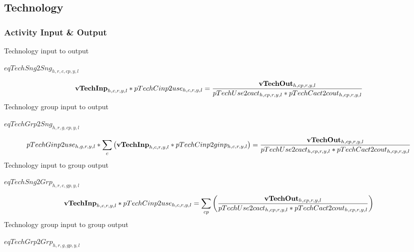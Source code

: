 \documentclass{article}
\begin{document}
\subsection*{Technology}
\subsubsection*{Activity Input \& Output}
Technology input to output







$eqTechSng2Sng_{h,r,c,cp,y,l}$





\begin{dmath} 
{\bf vTechInp}_{h,c,r,y,l}*pTechCinp2use_{h,c,r,y,l}  =  \frac{{\bf vTechOut}_{h,cp,r,y,l}}{pTechUse2cact_{h,cp,r,y,l}*pTechCact2cout_{h,cp,r,y,l}}
\end{dmath} 
Technology group input to output







$eqTechGrp2Sng_{h,r,g,cp,y,l}$





\begin{dmath} 
pTechGinp2use_{h,g,r,y,l}*\sum_{c}{\left({\bf vTechInp}_{h,c,r,y,l}*pTechCinp2ginp_{h,c,r,y,l}\right)}  =  \frac{{\bf vTechOut}_{h,cp,r,y,l}}{pTechUse2cact_{h,cp,r,y,l}*pTechCact2cout_{h,cp,r,y,l}}
\end{dmath} 
Technology input to group output







$eqTechSng2Grp_{h,r,c,gp,y,l}$





\begin{dmath} 
{\bf vTechInp}_{h,c,r,y,l}*pTechCinp2use_{h,c,r,y,l}  =  \sum_{cp}{\left(\frac{{\bf vTechOut}_{h,cp,r,y,l}}{pTechUse2cact_{h,cp,r,y,l}*pTechCact2cout_{h,cp,r,y,l}}\right)}
\end{dmath} 
Technology group input to group output







$eqTechGrp2Grp_{h,r,g,gp,y,l}$
\end{document}
